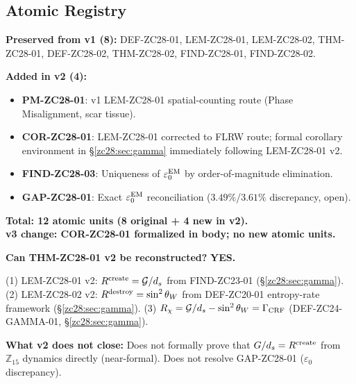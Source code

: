 \documentclass[12pt, a4paper]{article}
\begin{document}
\subsection{Atomic Registry}
\label{zc28:sec:registry}

\begin{formalbox}[title={Atomic Units in v3 (12 total, unchanged from v2)}]
\textbf{Preserved from v1 (8):} DEF-ZC28-01, LEM-ZC28-01,
  LEM-ZC28-02, THM-ZC28-01, DEF-ZC28-02, THM-ZC28-02,
  FIND-ZC28-01, FIND-ZC28-02.

\medskip
\textbf{Added in v2 (4):}
\begin{itemize}[leftmargin=*,noitemsep]
  \item \textbf{PM-ZC28-01}: v1 LEM-ZC28-01 spatial-counting
    route (Phase Misalignment, scar tissue).
  \item \textbf{COR-ZC28-01}: LEM-ZC28-01 corrected to FLRW
    route; formal corollary environment in \S\ref{zc28:sec:gamma}
    immediately following LEM-ZC28-01 v2.
  \item \textbf{FIND-ZC28-03}: Uniqueness of $\varepsilon_0^{\rm EM}$
    by order-of-magnitude elimination.
  \item \textbf{GAP-ZC28-01}: Exact $\varepsilon_0^{\rm EM}$
    reconciliation ($3.49\%$/$3.61\%$ discrepancy, open).
\end{itemize}
\textbf{Total: 12 atomic units (8 original + 4 new in v2).}\\
\textbf{v3 change: COR-ZC28-01 formalized in body; no new atomic units.}
\end{formalbox}

\begin{formalbox}[title={Reconstruction Test (CUIP No-Loss, v2)}]
\textbf{Can THM-ZC28-01 v2 be reconstructed?} \textbf{YES.}

(1) LEM-ZC28-01 v2: $R^{\rm create} = \mathcal{G}/d_s$
  from FIND-ZC23-01 (\S\ref{zc28:sec:gamma}).
(2) LEM-ZC28-02 v2: $R^{\rm destroy} = \sin^2\theta_W$
  from DEF-ZC20-01 entropy-rate framework (\S\ref{zc28:sec:gamma}).
(3) $R_\chi = \mathcal{G}/d_s - \sin^2\theta_W = \Gamma_{\rm CRF}$
  (DEF-ZC24-GAMMA-01, \S\ref{zc28:sec:gamma}).

\textbf{What v2 does not close:}
Does not formally prove that $G/d_s = R^{\rm create}$
from $\mathbb{Z}_{15}$ dynamics directly (near-formal).
Does not resolve GAP-ZC28-01 ($\varepsilon_0$ discrepancy).
\end{formalbox}
\end{document}
